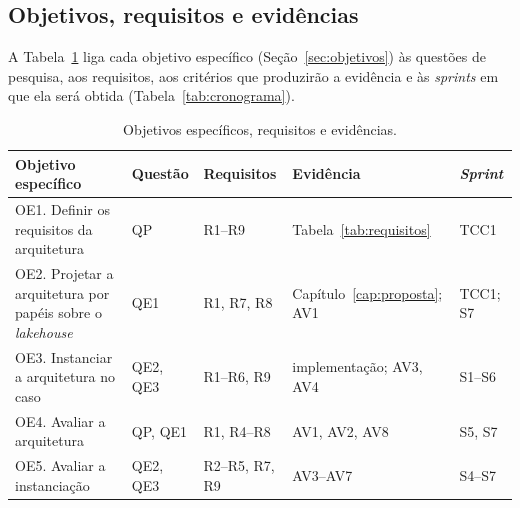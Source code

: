 \subsection{Objetivos, requisitos e evidências}

A Tabela~\ref{tab:objetivos-evidencias} liga cada objetivo específico (Seção~\ref{sec:objetivos}) às questões de pesquisa, aos requisitos, aos critérios que produzirão a evidência e às \textit{sprints} em que ela será obtida (Tabela~\ref{tab:cronograma}).

\begin{table}[htbp]
	\centering
	\caption{Objetivos específicos, requisitos e evidências.}
	\label{tab:objetivos-evidencias}
	\small
	\begin{tabularx}{\textwidth}{@{}>{\raggedright\arraybackslash}X l>{\raggedright\arraybackslash}p{2.0cm}>{\raggedright\arraybackslash}p{2.9cm}l@{}}
		\toprule
		\textbf{Objetivo específico} & \textbf{Questão} & \textbf{Requisitos} & \textbf{Evidência} & \textbf{\textit{Sprint}} \\
		\midrule
		OE1. Definir os requisitos da arquitetura & QP & R1--R9 & Tabela~\ref{tab:requisitos} & TCC1 \\ \addlinespace
		OE2. Projetar a arquitetura por papéis sobre o \textit{lakehouse} & QE1 & R1, R7, R8 & Capítulo~\ref{cap:proposta}; AV1 & TCC1; S7 \\ \addlinespace
		OE3. Instanciar a arquitetura no caso & QE2, QE3 & R1--R6, R9 & implementação; AV3, AV4 & S1--S6 \\ \addlinespace
		OE4. Avaliar a arquitetura & QP, QE1 & R1, R4--R8 & AV1, AV2, AV8 & S5, S7 \\ \addlinespace
		OE5. Avaliar a instanciação & QE2, QE3 & R2--R5, R7, R9 & AV3--AV7 & S4--S7 \\
		\bottomrule
	\end{tabularx}
\end{table}


